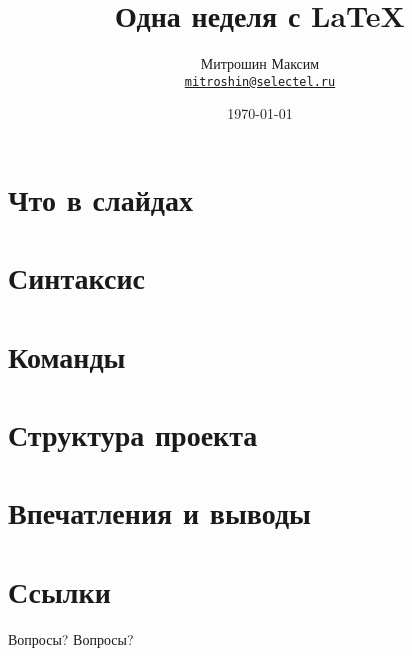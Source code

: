 \documentclass[10pt]{beamer}
\title{Одна неделя с \LaTeX}
\author[Митрошин Максим]{Митрошин Максим \\ \texttt{\href{mailto:mitroshin@selectel.ru}{mitroshin@selectel.ru}}}
\date{\today}
\institute{Selectel}
\begin{document}
\begin{frame}
\titlepage
\end{frame}

\section{Что в слайдах}

\section{Синтаксис}


\section{Команды}



\section{Структура проекта}

% 
% 

\section{Впечатления и выводы}


\section{Ссылки}


\begin{frame}{Вопросы?}
  Вопросы?
\end{frame}
\end{document}

